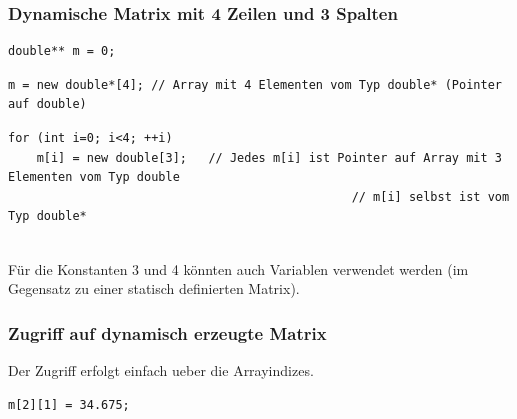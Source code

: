 \subsubsection{Dynamische Matrix mit 4 Zeilen und 3 Spalten}
\noindent
\begin{minipage}{0.2\linewidth}
\begin{lstlisting}
double** m = 0;
\end{lstlisting}
\end{minipage}%
\hspace{0.1\linewidth}
\begin{minipage}{0.6\linewidth}
	
\end{minipage}
\vspace{\baselineskip}
\noindent
\begin{minipage}{\linewidth}
\begin{lstlisting}
m = new double*[4];	// Array mit 4 Elementen vom Typ double* (Pointer auf double)
\end{lstlisting}
\end{minipage}
\begin{figure}[h]
	\centering
	
\end{figure}
\vspace{\baselineskip}
\noindent
\begin{minipage}{\linewidth}
\begin{lstlisting}
for (int i=0; i<4; ++i)	
	m[i] = new double[3];	// Jedes m[i] ist Pointer auf Array mit 3 Elementen vom Typ double
												// m[i] selbst ist vom Typ double*	
\end{lstlisting}
\end{minipage}
\begin{figure}[hh]
	\centering
	
\end{figure}
\\
Für die Konstanten 3 und 4 könnten auch Variablen verwendet werden (im Gegensatz zu einer statisch definierten Matrix).

\subsubsection{Zugriff auf dynamisch erzeugte Matrix}
Der Zugriff erfolgt einfach ueber die Arrayindizes.\\
\noindent
\begin{minipage}{0.25\linewidth}
\begin{lstlisting}
m[2][1] = 34.675;
\end{lstlisting}
\end{minipage}%
\hspace{0.1\linewidth}
\begin{minipage}{0.5\linewidth}
	
\end{minipage}


